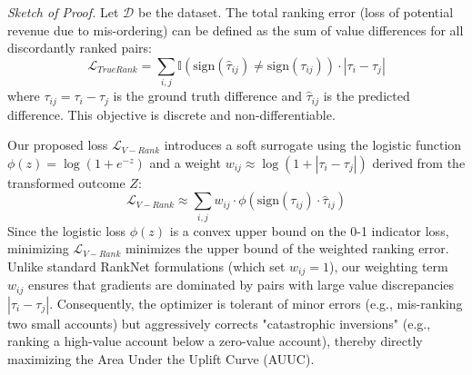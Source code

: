 \documentclass[runningheads]{llncs}
\begin{document}
\textit{Sketch of Proof.} 
Let $\mathcal{D}$ be the dataset. The total ranking error (loss of potential revenue due to mis-ordering) can be defined as the sum of value differences for all discordantly ranked pairs:
\begin{equation}
    \mathcal{L}_{TrueRank} = \sum_{i,j} \mathbb{I}(\text{sign}(\hat{\tau}_{ij}) \neq \text{sign}(\tau_{ij})) \cdot |\tau_i - \tau_j|
\end{equation}
where $\tau_{ij} = \tau_i - \tau_j$ is the ground truth difference and $\hat{\tau}_{ij}$ is the predicted difference. This objective is discrete and non-differentiable.

Our proposed loss $\mathcal{L}_{V-Rank}$ introduces a soft surrogate using the logistic function $\phi(z) = \log(1 + e^{-z})$ and a weight $w_{ij} \approx \log(1 + |\tau_i - \tau_j|)$ derived from the transformed outcome $Z$:
\begin{equation}
    \mathcal{L}_{V-Rank} \approx \sum_{i,j} w_{ij} \cdot \phi(\text{sign}(\tau_{ij}) \cdot \hat{\tau}_{ij})
\end{equation}
Since the logistic loss $\phi(z)$ is a convex upper bound on the 0-1 indicator loss, minimizing $\mathcal{L}_{V-Rank}$ minimizes the upper bound of the weighted ranking error. Unlike standard RankNet formulations (which set $w_{ij}=1$), our weighting term $w_{ij}$ ensures that gradients are dominated by pairs with large value discrepancies $|\tau_i - \tau_j|$. Consequently, the optimizer is tolerant of minor errors (e.g., mis-ranking two small accounts) but aggressively corrects "catastrophic inversions" (e.g., ranking a high-value account below a zero-value account), thereby directly maximizing the Area Under the Uplift Curve (AUUC).


\end{document}
